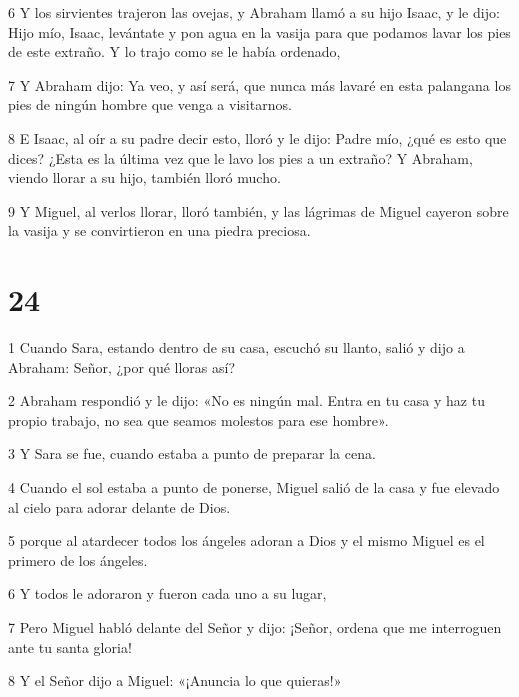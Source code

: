 \par 6 Y los sirvientes trajeron las ovejas, y Abraham llamó a su hijo Isaac, y le dijo: Hijo mío, Isaac, levántate y pon agua en la vasija para que podamos lavar los pies de este extraño. Y lo trajo como se le había ordenado,

\par 7 Y Abraham dijo: Ya veo, y así será, que nunca más lavaré en esta palangana los pies de ningún hombre que venga a visitarnos.

\par 8 E Isaac, al oír a su padre decir esto, lloró y le dijo: Padre mío, ¿qué es esto que dices? ¿Esta es la última vez que le lavo los pies a un extraño? Y Abraham, viendo llorar a su hijo, también lloró mucho.

\par 9 Y Miguel, al verlos llorar, lloró también, y las lágrimas de Miguel cayeron sobre la vasija y se convirtieron en una piedra preciosa.

\chapter{24}

\par 1 Cuando Sara, estando dentro de su casa, escuchó su llanto, salió y dijo a Abraham: Señor, ¿por qué lloras así?

\par 2 Abraham respondió y le dijo: «No es ningún mal. Entra en tu casa y haz tu propio trabajo, no sea que seamos molestos para ese hombre».

\par 3 Y Sara se fue, cuando estaba a punto de preparar la cena.

\par 4 Cuando el sol estaba a punto de ponerse, Miguel salió de la casa y fue elevado al cielo para adorar delante de Dios.

\par 5 porque al atardecer todos los ángeles adoran a Dios y el mismo Miguel es el primero de los ángeles.

\par 6 Y todos le adoraron y fueron cada uno a su lugar,

\par 7 Pero Miguel habló delante del Señor y dijo: ¡Señor, ordena que me interroguen ante tu santa gloria!

\par 8 Y el Señor dijo a Miguel: «¡Anuncia lo que quieras!»

